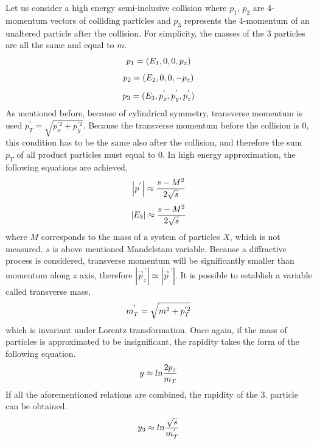 \newline
Let us consider a high energy semi-inclusive collision where $p_1$, $p_2$ are 4-momentum vectors of colliding particles and $p_3$ represents the 4-momentum of an unaltered particle after the collision. For simplicity, the masses of the 3 particles are all the same and equal to $m$. 
\begin{equation}
\centering
p_1 = (E_1,0,0,p_z)
\label{t13}
\end{equation}
\begin{equation}
\centering
p_2 = (E_2,0,0,-p_z)
\label{t14}
\end{equation}
\begin{equation}
\centering
p_3 = (E_3,p_x^{'}, p^{'}_y ,p_z^{'})
\label{t15}
\end{equation}
As mentioned before, because of cylindrical symmetry, transverse momentum is used $p^{'}_T = \sqrt{p_x^{'2} + p_y^{'2}}$. Because the transverse momentum before the collision is 0, this condition has to be the same also after the collision, and therefore the sum $p_T$ of all product particles must equal to 0. In high energy approximation, the following equations are achieved,
\begin{equation}
\centering
\left|p^{'}\right| \approx \frac{s - M^2}{2\sqrt{s}}
\label{t17}
\end{equation}
\begin{equation}
\centering
\left|E_3\right| \approx \frac{s - M^2}{2\sqrt{s}}
\label{t18}
\end{equation}
where $M$ corresponds to the mass of a system of particles $X$, which is not measured. $s$ is above mentioned Mandelstam variable. Because a diffractive process is considered, transverse momentum will be significantly smaller than momentum along $z$ axis, therefore $\left|\vec{p}_z^{~'} \right| \simeq \left| \vec{p}^{~'} \right|$. It is possible to establish a variable called transverse mass,
\begin{equation}
\centering
m^{'}_{T} = \sqrt{m^2 + p^{'2}_{T}}
\label{t24}
\end{equation}
which is invariant under Lorentz transformation. Once again, if the mass of particles is approximated to be insignificant, the rapidity takes the form of the following equation.
\begin{equation}
\centering
y \approx ln \frac{2p_z}{m_{T}}
\label{t16}
\end{equation}
If all the aforementioned relations are combined, the rapidity of the 3. particle can be obtained.
\begin{equation}
\centering
y_3 \approx ln \frac{\sqrt{s}}{m^{'}_{T}}
\label{t19}
\end{equation}
